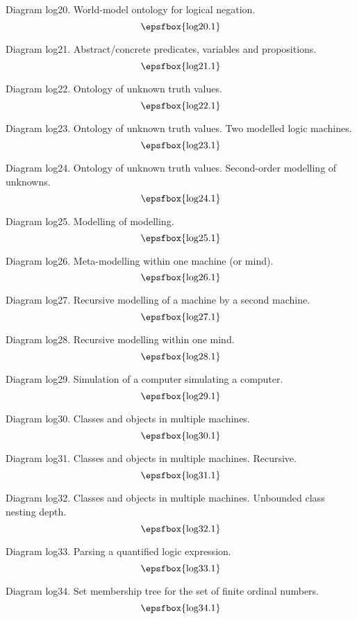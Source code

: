 Diagram log20. World-model ontology for logical negation.
$$
\centerline{\epsfbox{log20.1}}
$$

\filleject

Diagram log21. Abstract/concrete predicates, variables and propositions.
$$
\centerline{\epsfbox{log21.1}}
$$

Diagram log22. Ontology of unknown truth values.
$$
\centerline{\epsfbox{log22.1}}
$$

Diagram log23. Ontology of unknown truth values. Two modelled logic machines.
$$
\centerline{\epsfbox{log23.1}}
$$

\filleject

Diagram log24. Ontology of unknown truth values. Second-order modelling of
unknowns.
$$
\centerline{\epsfbox{log24.1}}
$$

Diagram log25. Modelling of modelling.
$$
\centerline{\epsfbox{log25.1}}
$$

Diagram log26. Meta-modelling within one machine (or mind).
$$
\centerline{\epsfbox{log26.1}}
$$

Diagram log27. Recursive modelling of a machine by a second machine.
$$
\centerline{\epsfbox{log27.1}}
$$

\filleject

Diagram log28. Recursive modelling within one mind.
$$
\centerline{\epsfbox{log28.1}}
$$

Diagram log29. Simulation of a computer simulating a computer.
$$
\centerline{\epsfbox{log29.1}}
$$

Diagram log30. Classes and objects in multiple machines.
$$
\centerline{\epsfbox{log30.1}}
$$

Diagram log31. Classes and objects in multiple machines. Recursive.
$$
\centerline{\epsfbox{log31.1}}
$$

Diagram log32. Classes and objects in multiple machines. Unbounded class nesting
depth.
$$
\centerline{\epsfbox{log32.1}}
$$

\filleject

Diagram log33. Parsing a quantified logic expression.
$$
\centerline{\epsfbox{log33.1}}
$$

Diagram log34. Set membership tree for the set of finite ordinal numbers.
$$
\centerline{\epsfbox{log34.1}}
$$

